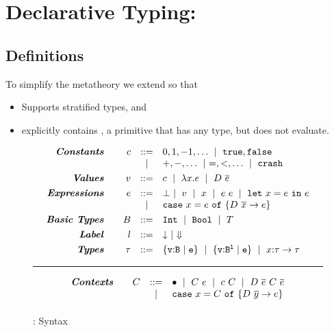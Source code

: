 \section{Declarative Typing: \undeclang}

\subsection{Definitions}
To simplify the metatheory we extend \undeclang so that
\begin{itemize}
\item Supports stratified types, and
\item explicitly contains \ebot, a primitive that has any type, but does not evaluate. 
\end{itemize}


\begin{figure}
$$
\begin{array}{rrcl}

\emphbf{Constants} \quad 
  & c & ::=    & 0,1,-1,\ldots \spmid \etrue, \efalse \\
  &   & \spmid & +,-,\ldots \spmid =, <, \ldots \spmid \ecrash 
  \\[0.05in]

\emphbf{Values} \quad 
  & v & ::= &  c \spmid \efun{x}{\typ}{e} \spmid \edapp{D}{e}
  \\[0.05in] 

\emphbf{Expressions} \quad 
  & e & ::=    & \ebot \spmid v \spmid x \spmid \eapp{e}{e} \spmid \elet{x}{e}{e} \\ 
  &   & \spmid & \ecase{e}{D}{\overline{x}}{e}{x} \\[0.05in] 

\emphbf{Basic Types} \quad 
  & \tbase & ::= & \tint \spmid \tbool \spmid T \\[0.05in] 

\emphbf{Label} \quad 
  & l
  & ::= 
  & \trivial \spmid \finite 
  \\[0.05in] 
  
\emphbf{Types} \quad 
  & \typ & ::= & \tlref{v}{\tbase}{}{e} \spmid \tlref{v}{\tbase}{l}{e} \spmid
  				 \tfunref{x}{\typ}{\typ}{v}{e} \\ 
\end{array}
$$

\hrule width 0.48\textwidth

$$
\begin{array}{rrcl}
\emphbf{Contexts} \quad 
  & C
  & ::= 
  &   	 \bullet 
  \spmid \eapp{C}{e} 
  \spmid \eapp{c}{C} 
  \spmid D\ \overline{e}\ C\ \overline{e}\\
  &&\spmid &
  \ecase{C}{D}{\overline{y}}{e}{x}
  \\[0.05in] 
\end{array}
$$

\caption{\undeclang: Syntax}
\label{fig:undeclang}
\label{fig:operational}
\end{figure}

